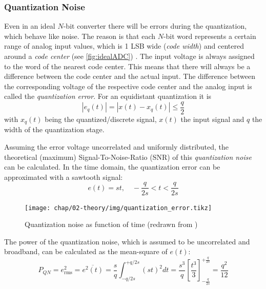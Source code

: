 \subsubsection{Quantization Noise}
Even in an ideal $N$-bit converter there will be errors during the quantization, which behave like noise. The reason is that each $N$-bit word represents a certain range of analog input values, which is 1 LSB wide (\textit{code width}) and centered around a \textit{code center} (see \autoref{fig:idealADC}) \cite{Lundberg}. The input voltage is always assigned to the word of the nearest code center. This means that there will always be a difference between the code center and the actual input. The difference between the corresponding voltage of the respective code center and the analog input is called the \textit{quantization error}. For an equidistant quantization it is
\begin{equation}
\left| e_q(t) \right| = \left| x(t) - x_q(t) \right| \leq \frac{q}{2}
\end{equation}
with $x_q(t)$ being the quantized/discrete signal, $x(t)$ the input signal and $q$ the width of the quantization stage. \cite{puente2015} 

Assuming the error voltage uncorrelated and uniformly distributed, the theoretical (maximum) Signal-To-Noise-Ratio (SNR) of this \textit{quantization noise} can be calculated. In the time domain, the quantization error can be approximated with a sawtooth signal:
\begin{equation}
e(t) = st, \quad -\frac{q}{2s} < t < \frac{q}{2s} 
\end{equation}
\begin{figure}[H]
	\centering
	\texttt{[image: chap/02-theory/img/quantization\_error.tikz]}
	\caption{Quantization noise as function of time (redrawn from \cite{walt})}
	\label{fig:eq}
\end{figure}

The power of the quantization noise, which is assumed to be uncorrelated and broadband, can be calculated as the mean-square of $e(t)$:
\begin{equation}
P_{QN} = e_{\text{rms}}^{2} = \overline{e^{2}(t)} = \frac{s}{q}\int_{-q/2s}^{+q/2s} (st)^{2} dt = \frac{s^3}{q} \left[ \frac{t^3}{3}\right]_{-\frac{q}{2s}}^{+\frac{q}{2s}} = \frac{q^2}{12}
\end{equation}

